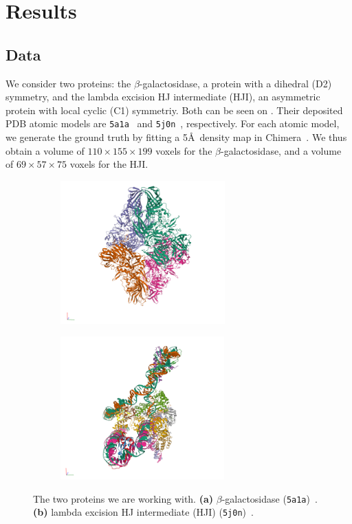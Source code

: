 \section{Results}

\subsection{Data}\label{sec:results:data}

We consider two proteins: the $\beta$-galactosidase, a protein with a dihedral (D2) symmetry, and the lambda excision HJ intermediate (HJI), an asymmetric protein with local cyclic (C1) symmetriy. Both can be seen on .
Their deposited PDB atomic models are \texttt{5a1a}~\cite{bartesaghi2015betagal} and \texttt{5j0n}~\cite{laxmikanthan2016structure}, respectively.
For each atomic model, we generate the ground truth by fitting a 5\AA\ density map in Chimera~\cite{pettersen2004ucsf}.
We thus obtain a volume of $110 \times 155 \times 199$ voxels for the $\beta$-galactosidase, and a volume of $69 \times 57 \times 75$ voxels for the HJI.

\begin{figure}[ht!]
    \centering
    \begin{subfigure}[b]{0.45\textwidth}
        \includegraphics[height=5.5cm]{figures/5a1a_pdb.png}
        \caption{}
    \end{subfigure}
    \begin{subfigure}[b]{0.45\textwidth}
    \centering
        \includegraphics[height=5.5cm]{figures/5j0n_pdb.png}
        \caption{}
    \end{subfigure}
    
    \caption{%
        The two proteins we are working with.
        \textbf{(a)} $\beta$-galactosidase (\texttt{5a1a})~\cite{5a1a_pdb}.
        \textbf{(b)} lambda excision HJ intermediate (HJI) (\texttt{5j0n})~\cite{5j0n_pdb}.
    }\label{fig:pdb-proteins}
\end{figure}


